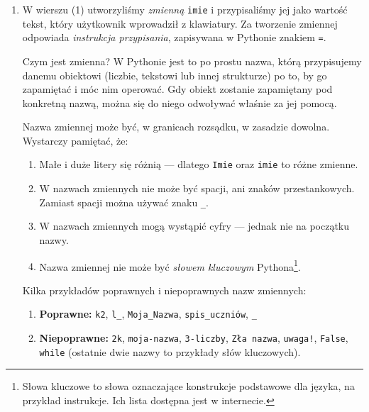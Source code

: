 \documentclass[a4paper]{article}
\begin{document}
\begin{enumerate}[label=ad. {\arabic*}]
  \item
        W wierszu (1) utworzyliśmy \emph{zmienną} \texttt{imie} i przypisaliśmy jej jako wartość tekst, który użytkownik wprowadził z klawiatury. Za tworzenie zmiennej odpowiada \emph{instrukcja przypisania}, zapisywana w Pythonie znakiem \texttt{=}.

        Czym jest zmienna? W Pythonie jest to po prostu nazwa, którą przypisujemy danemu obiektowi (liczbie, tekstowi lub innej strukturze) po to, by go zapamiętać i móc nim operować. Gdy obiekt zostanie zapamiętany pod konkretną nazwą, można się do niego odwoływać właśnie za jej pomocą.

        Nazwa zmiennej może być, w granicach rozsądku, w zasadzie dowolna. Wystarczy pamiętać, że:

        \begin{enumerate}[label=--]
          \item Małe i duże litery się różnią --- dlatego \texttt{Imie} oraz \texttt{imie} to różne zmienne.
          \item W nazwach zmiennych nie może być spacji, ani znaków przestankowych. Zamiast spacji można używać znaku \texttt{\_}.
          \item W nazwach zmiennych mogą wystąpić cyfry --- jednak nie na początku nazwy.
          \item Nazwa zmiennej nie może być \emph{słowem kluczowym} Pythona\footnote{Słowa kluczowe to słowa oznaczające konstrukcje podstawowe dla języka, na przykład instrukcje. Ich lista dostępna jest w internecie.}.
        \end{enumerate}


        Kilka przykładów poprawnych i niepoprawnych nazw zmiennych:
        \begin{enumerate}[label=--]
          \item \textbf{Poprawne:} \texttt{k2}, \texttt{l\_}, \texttt{Moja\_Nazwa}, \texttt{spis\_uczniów}, \texttt{\_}
          \item \textbf{Niepoprawne:} \texttt{2k}, \texttt{moja-nazwa}, \texttt{3-liczby}, \texttt{Zła nazwa}, \texttt{uwaga!}, \texttt{False}, \lstinline|while| (ostatnie dwie nazwy to przykłady słów kluczowych).
        \end{enumerate}


\end{enumerate}
\end{document}
